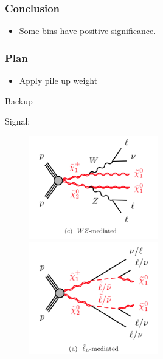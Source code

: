 \documentclass[mathserif,serif]{beamer}
\begin{document}
%
%

\def \PathToPlot {../plot}
%


%

\begin{frame}
\frametitle{Conclusion}
\begin{itemize}
\item Some bins have positive significance.
\end{itemize}
\end{frame}

\begin{frame}
\frametitle{Plan}
\begin{itemize}
\item Apply pile up weight
\end{itemize}
\end{frame}

\begin{frame}
\begin{center}
\huge
Backup
\end{center}
\end{frame}

\begin{frame}
\small
Signal:\\
\begin{figure}
\includegraphics[width=0.5\textwidth]{data/WZ.png}
\includegraphics[width=0.5\textwidth]{data/slepton.png}
\end{figure}
\end{frame}
\end{document}
